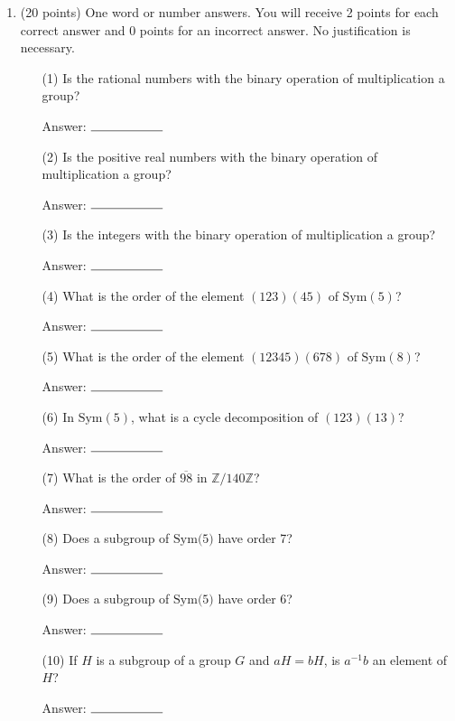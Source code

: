 \documentclass[11pt]{article}
\newcommand{\Z}{\mathbb{Z}}
\begin{document}
\begin{enumerate}

\item (20 points) One word or number answers. You will receive 2 points for each correct answer and 0 points for an incorrect answer. No justification is necessary.
\begin{enumerate} \item[(1)]  Is the rational numbers with the binary operation of multiplication a group?

Answer: $\rule{2cm}{0.15mm}$

\item[(2)] Is the positive real numbers with the binary operation of multiplication a group?

Answer: $\rule{2cm}{0.15mm}$

\item[(3)]  Is the integers with the binary operation of multiplication a group?

Answer: $\rule{2cm}{0.15mm}$

\item[(4)] What is the order of the element $(123)(45)$ of $\text{Sym}(5)$?

Answer: $\rule{2cm}{0.15mm}$

\item[(5)] What is the order of the element $(12345)(678)$ of $\text{Sym}(8)$?

Answer: $\rule{2cm}{0.15mm}$

\item[(6)] In $\text{Sym}(5)$, what is a cycle decomposition of $(123)(13)$?

Answer: $\rule{2cm}{0.15mm}$

\item[(7)] What is the order of $\overline{98}$ in $\Z/140\Z$?

Answer: $\rule{2cm}{0.15mm}$

\item[(8)] Does a subgroup of $\text{Sym(5)}$ have order 7?

Answer: $\rule{2cm}{0.15mm}$

\item[(9)] Does a subgroup of $\text{Sym(5)}$ have order 6?

Answer: $\rule{2cm}{0.15mm}$

\item[(10)] If $H$ is a subgroup of a group $G$ and $aH = bH$, is $a^{-1}b$ an element of $H$?

Answer: $\rule{2cm}{0.15mm}$


\end{enumerate}
\end{enumerate}
\end{document}
